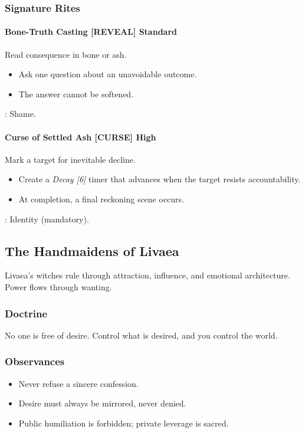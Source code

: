 \subsubsection*{Signature Rites}

\paragraph{Bone-Truth Casting \hfill \textnormal{[REVEAL] Standard}}
Read consequence in bone or ash.
\begin{itemize}
  \item Ask one question about an unavoidable outcome.
  \item The answer cannot be softened.
\end{itemize}
: Shame.

\paragraph{Curse of Settled Ash \hfill \textnormal{[CURSE] High}}
Mark a target for inevitable decline.
\begin{itemize}
  \item Create a \emph{Decay [6]} timer that advances when the target resists accountability.
  \item At completion, a final reckoning scene occurs.
\end{itemize}
: Identity (mandatory).

\subsection{The Handmaidens of Livaea}
Livaea's witches rule through attraction, influence, and emotional architecture. Power flows through wanting.

\subsubsection*{Doctrine}
No one is free of desire. Control what is desired, and you control the world.

\subsubsection*{Observances}
\begin{itemize}
  \item Never refuse a sincere confession.
  \item Desire must always be mirrored, never denied.
  \item Public humiliation is forbidden; private leverage is sacred.
\end{itemize}

